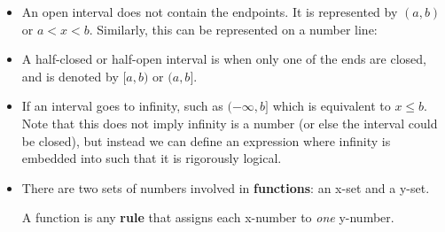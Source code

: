 \begin{itemize}
\begin{center}
    \end{center}
    \item An open interval does not contain the endpoints. It is represented by $(a,b)$ or $a<x<b$. Similarly, this can be represented on a number line:
    \begin{center}
    \end{center}
    \item A half-closed or half-open interval is when only one of the ends are closed, and is denoted by $[a,b)$ or $(a,b]$.
    \item If an interval goes to infinity, such as $(-\infty,b]$ which is equivalent to $x\le b$. Note that this does not imply infinity is a number (or else the interval could be closed), but instead we can define an expression where infinity is embedded into such that it is rigorously logical.
    \begin{center}
    \end{center}
    \item There are two sets of numbers involved in \textbf{functions}: an x-set and a y-set.
    \begin{definition}
        A function is any \textbf{rule} that assigns each x-number to \emph{one} y-number.
    \end{definition}

\end{itemize}
